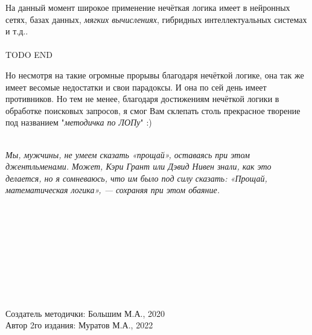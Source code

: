 \documentclass[18pt, a4paper]{extarticle}
\begin{document}
На данный момент широкое применение нечёткая логика имеет в нейронных сетях, базах данных, \textit{мягких вычислениях}, гибридных интеллектуальных системах и т.д..\\\\

TODO END

Но несмотря на такие огромные прорывы благодаря нечёткой логике, она так же имеет весомые недостатки и свои парадоксы. И она по сей день имеет противников. Но тем не менее, благодаря достижениям нечёткой логики в обработке поисковых запросов, я смог Вам склепать столь прекрасное творение под названием "\textit{методичка по ЛОПу}"{} :) \\\\

\begin{center}
    \textit{Мы, мужчины, не умеем сказать «прощай», оставаясь при этом джентльменами. Может, Кэри Грант или Дэвид Нивен знали, как это делается, но я сомневаюсь, что им было под силу сказать: «Прощай, математическая логика», — сохраняя при этом обаяние.}
\end{center}
\leavevmode\\\\\leavevmode\\\\\leavevmode\\\\\leavevmode\\\\
\begin{flushright}
	Создатель методички: Большим М.А., 2020\\
	Автор 2го издания: Муратов М.А., 2022
\end{flushright}
\end{document}
